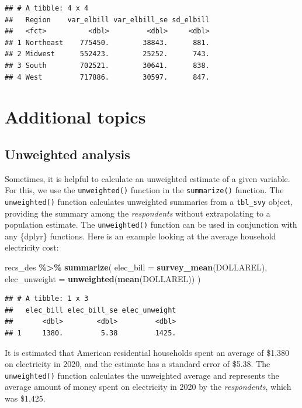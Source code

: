 \documentclass[
]{krantz}
\makeatletter
\newenvironment{Shaded}{\begin{snugshade}}{\end{snugshade}}
\newcommand{\AttributeTok}[1]{\textcolor[rgb]{0.27,0.27,0.27}{#1}}
\newcommand{\FunctionTok}[1]{\textcolor[rgb]{0.27,0.27,0.27}{\textbf{#1}}}
\newcommand{\NormalTok}[1]{#1}
\newcommand{\SpecialCharTok}[1]{\textcolor[rgb]{0.43,0.43,0.43}{\textbf{#1}}}
\newenvironment{kframe}{%
\medskip{}
\setlength{\fboxsep}{.8em}
 \def\at@end@of@kframe{}%
 \ifinner\ifhmode%
  \def\at@end@of@kframe{\end{minipage}}%
  \begin{minipage}{\columnwidth}%
 \fi\fi%
 \def\FrameCommand##1{\hskip\@totalleftmargin \hskip-\fboxsep
 \colorbox{shadecolor}{##1}\hskip-\fboxsep
     \hskip-\linewidth \hskip-\@totalleftmargin \hskip\columnwidth}%
 \MakeFramed {\advance\hsize-\width
   \@totalleftmargin\z@ \linewidth\hsize
   \@setminipage}}%
 {\par\unskip\endMakeFramed%
 \at@end@of@kframe}
\renewenvironment{Shaded}{\begin{kframe}}{\end{kframe}}
\makeatother
\begin{document}
\begin{verbatim}
## # A tibble: 4 x 4
##   Region    var_elbill var_elbill_se sd_elbill
##   <fct>          <dbl>         <dbl>     <dbl>
## 1 Northeast    775450.        38843.      881.
## 2 Midwest      552423.        25252.      743.
## 3 South        702521.        30641.      838.
## 4 West         717886.        30597.      847.
\end{verbatim}

\hypertarget{additional-topics}{%
\section{Additional topics}\label{additional-topics}}

\hypertarget{unweighted-analysis}{%
\subsection{Unweighted analysis}\label{unweighted-analysis}}

Sometimes, it is helpful to calculate an unweighted estimate of a given variable. For this, we use the \texttt{unweighted()} function in the \texttt{summarize()} function. The \texttt{unweighted()} function calculates unweighted summaries from a \texttt{tbl\_svy} object, providing the summary among the \emph{respondents} without extrapolating to a population estimate. The \texttt{unweighted()} function can be used in conjunction with any \{dplyr\} functions. Here is an example looking at the average household electricity cost:

\begin{Shaded}
\begin{Highlighting}[]
\NormalTok{recs\_des }\SpecialCharTok{\%\textgreater{}\%}
  \FunctionTok{summarize}\NormalTok{(}
    \AttributeTok{elec\_bill =} \FunctionTok{survey\_mean}\NormalTok{(DOLLAREL),}
    \AttributeTok{elec\_unweight =} \FunctionTok{unweighted}\NormalTok{(}\FunctionTok{mean}\NormalTok{(DOLLAREL))}
\NormalTok{  )}
\end{Highlighting}
\end{Shaded}

\begin{verbatim}
## # A tibble: 1 x 3
##   elec_bill elec_bill_se elec_unweight
##       <dbl>        <dbl>         <dbl>
## 1     1380.         5.38         1425.
\end{verbatim}

It is estimated that American residential households spent an average of \$1,380 on electricity in 2020, and the estimate has a standard error of \$5.38. The \texttt{unweighted()} function calculates the unweighted average and represents the average amount of money spent on electricity in 2020 by the \emph{respondents}, which was \$1,425.
\end{document}
